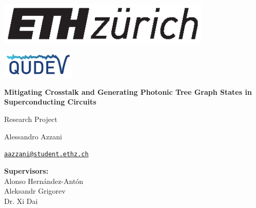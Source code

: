 \begin{titlepage}
    \noindent
    \begin{minipage}{0.4\textwidth}
        \begin{flushleft}
            \includegraphics[height=2.0cm]{Title/eth_logo.eps}
        \end{flushleft}
    \end{minipage}
    \hfill
    \begin{minipage}{0.4\textwidth}
        \begin{flushright}
            \includegraphics[height=1.3cm]{Title/Qudev_logo.pdf} %
        \end{flushright}
    \end{minipage}

    \vspace{3cm}

    \begin{center}
        \begin{spacing}{2.0}
            {\huge \bfseries Mitigating Crosstalk and Generating Photonic Tree Graph States in Superconducting Circuits}
        \end{spacing}

        \large
        Research Project {\MakeUppercase{}}
    \end{center}

    \vspace{1.2cm}

    \begin{center}
        \large
        Alessandro Azzani

        \begingroup
            \hypersetup{urlcolor=black}
            \href{mailto:aazzani@student.ethz.ch}
            {\texttt{\small aazzani@student.ethz.ch}} 
        \endgroup
    \end{center}

    \vfill

    \begin{center}
        \textbf{Supervisors:} \\
        Alonso Hernández-Antón \\
        Aleksandr Grigorev \\
        Dr. Xi Dai \\


\end{center}
\end{titlepage}

